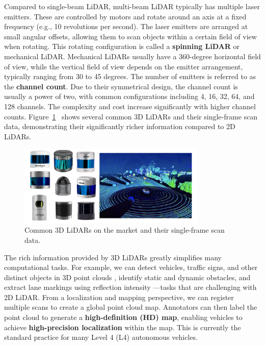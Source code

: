 Compared to single-beam LiDAR, multi-beam LiDAR typically has multiple laser emitters. These are controlled by motors and rotate around an axis at a fixed frequency (e.g., 10 revolutions per second). The laser emitters are arranged at small angular offsets, allowing them to scan objects within a certain field of view when rotating. This rotating configuration is called a \textbf{spinning LiDAR} or mechanical LiDAR. Mechanical LiDARs usually have a 360-degree horizontal field of view, while the vertical field of view depends on the emitter arrangement, typically ranging from 30 to 45 degrees. The number of emitters is referred to as the \textbf{channel count}. Due to their symmetrical design, the channel count is usually a power of two, with common configurations including 4, 16, 32, 64, and 128 channels. The complexity and cost increase significantly with higher channel counts. Figure~\ref{fig:3d-lidars}~ shows several common 3D LiDARs and their single-frame scan data, demonstrating their significantly richer information compared to 2D LiDARs.

\begin{figure}[!htp]
	\centering
	\includegraphics[width=0.8\textwidth]{resources/3d-lidar-mapping/3d-lidars.pdf}
	\caption{Common 3D LiDARs on the market and their single-frame scan data.}
	\label{fig:3d-lidars}
\end{figure}

The rich information provided by 3D LiDARs greatly simplifies many computational tasks. For example, we can detect vehicles, traffic signs, and other distinct objects in 3D point clouds \cite{Zhou2018,Shi2019}, identify static and dynamic obstacles, and extract lane markings using reflection intensity \cite{Sithole2003,Fernandes2021}—tasks that are challenging with 2D LiDAR. From a localization and mapping perspective, we can register multiple scans to create a global point cloud map. Annotators can then label the point cloud to generate a \textbf{high-definition (HD) map}, enabling vehicles to achieve \textbf{high-precision localization} within the map. This is currently the standard practice for many Level 4 (L4) autonomous vehicles.


